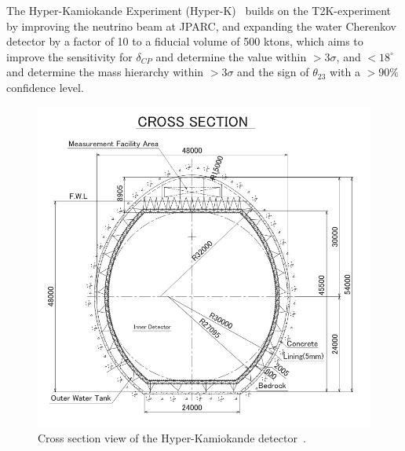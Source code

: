 The Hyper-Kamiokande Experiment (Hyper-K)~\cite{24HyperK}  builds on the T2K-experiment~\cite{21T2K} by improving the neutrino beam at JPARC, and expanding the water Cherenkov detector by a factor of 10 to a fiducial volume of 500 ktons, which aims to improve the sensitivity for $\delta_{CP}$ and determine the value within $>3\sigma$, and $<18^\circ$ and determine the mass hierarchy within $>3\sigma$ and the sign of $\theta_{23}$ with a $>90\%$ confidence level.

\begin{figure}[h!]
  \centering
  \begin{minipage}[b]{0.59\textwidth}
    \includegraphics[width=\textwidth]{figures/hyper1.jpeg}
    \vspace{2mm}
    \caption{Cross section view of the Hyper-Kamiokande detector~\cite{24HyperK}.}
    \label{fig:hyper1}
  \end{minipage}
  \hfill
  \begin{minipage}[b]{0.39\textwidth}

\end{minipage}
\end{figure}
